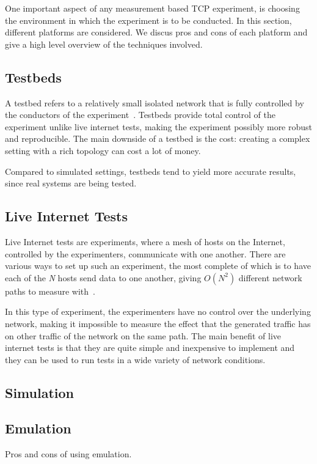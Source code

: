 One important aspect of any measurement based TCP experiment, is choosing the environment in which the experiment is to be conducted. In this section, different platforms are considered. We discus pros and cons of each platform and give a high level overview of the techniques involved.  

\subsection{Testbeds}
A testbed refers to a relatively small isolated network that is fully controlled by the conductors of the experiment~\cite{Allman99}. Testbeds provide total control of the experiment unlike live internet tests, making the experiment possibly more robust and reproducible. The main downside of a testbed is the cost: creating a complex setting with a rich topology can cost a lot of money. 

Compared to simulated settings, testbeds tend to yield more accurate results, since real systems are being tested. 

\subsection{Live Internet Tests}
Live Internet tests are experiments, where a mesh of hosts on the Internet, controlled by the experimenters, communicate with one another. There are various ways to set up such an experiment, the most complete of which is to have each of the \textit{N} hosts send data to one another, giving \textit{$O(N^2)$} different network paths to measure with~\cite{Allman99}.

In this type of experiment, the experimenters have no control over the underlying network, making it impossible to measure the effect that the generated traffic has on other traffic of the network on the same path. The main benefit of live internet tests is that they are quite simple and inexpensive to implement and they can be used to run tests in a wide variety of network conditions.

\subsection{Simulation} 

\subsection{Emulation}
Pros and cons of using emulation.
